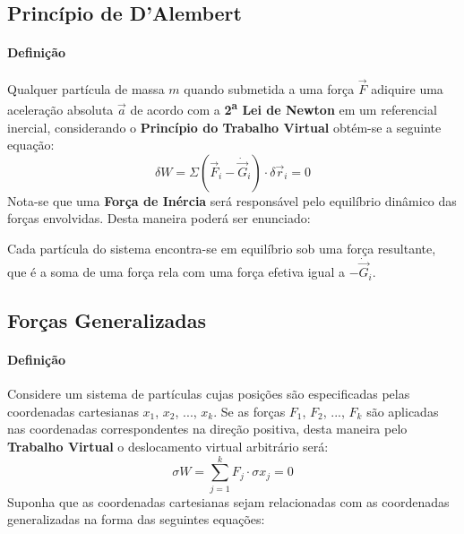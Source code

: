 \documentclass{article}
\begin{document}
        \subsection{Princípio de D'Alembert}
            \paragraph{Definição}Qualquer partícula de massa $m$ quando submetida a uma força $\vec{F}$ adiquire uma aceleração absoluta $\vec{a}$ de acordo com a \textbf{2\textsuperscript{a} Lei de Newton} em um referencial inercial, considerando o \textbf{Princípio do Trabalho Virtual} obtém-se a seguinte equação:
                \begin{equation}
                    \boxed{
                        \delta W = 
                        \Sigma
                        \left(
                            \vec{F}_{i} - \dot{\vec{G}}_{i}
                        \right) \cdot \delta\vec{r}_{i} = 0
                    }
                \end{equation}
            Nota-se que uma \textbf{Força de Inércia} será responsável pelo equilíbrio dinâmico das forças envolvidas. Desta maneira poderá ser enunciado:
                \begin{displayquote}[][]
                    Cada partícula do sistema encontra-se em equilíbrio sob uma força resultante, que é a soma de uma força rela com uma força efetiva igual a $-\dot{\vec{G}}_{i}$.
                \end{displayquote}

        \subsection{Forças Generalizadas}
            \paragraph{Definição}Considere um sistema de partículas cujas posições são especificadas pelas coordenadas cartesianas $x_{1}$, $x_{2}$, ..., $x_{k}$. Se as forças $F_{1}$, $F_{2}$, ..., $F_{k}$ são aplicadas nas coordenadas correspondentes na direção positiva, desta maneira pelo \textbf{Trabalho Virtual} o deslocamento virtual arbitrário será:
                \begin{equation}
                    \boxed{
                        \sigma W = 
                        \sum_{j=1}^{k} F_{j} \cdot 
                        \sigma x_{j} = 0
                    }
                \end{equation}
            Suponha que as coordenadas cartesianas sejam relacionadas com as coordenadas generalizadas na forma das seguintes equações:
\end{document}
